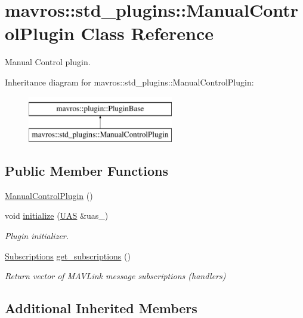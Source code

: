 \hypertarget{classmavros_1_1std__plugins_1_1ManualControlPlugin}{}\section{mavros\+::std\+\_\+plugins\+::Manual\+Control\+Plugin Class Reference}
\label{classmavros_1_1std__plugins_1_1ManualControlPlugin}


Manual Control plugin.  


Inheritance diagram for mavros\+::std\+\_\+plugins\+::Manual\+Control\+Plugin\+:\begin{figure}[H]
\begin{center}
\leavevmode
\includegraphics[height=2.000000cm]{classmavros_1_1std__plugins_1_1ManualControlPlugin}
\end{center}
\end{figure}
\subsection*{Public Member Functions}
\begin{DoxyCompactItemize}
\item 
\mbox{\hyperlink{group__plugin_ga8e2654a3b76c1f377d99fd21817d8e3c}{Manual\+Control\+Plugin}} ()
\item 
void \mbox{\hyperlink{group__plugin_ga20c1a742c3270e32e681f08f79199451}{initialize}} (\mbox{\hyperlink{classmavros_1_1UAS}{U\+AS}} \&uas\+\_\+)
\begin{DoxyCompactList}\small\item\em Plugin initializer. \end{DoxyCompactList}\item 
\mbox{\hyperlink{group__plugin_ga8967d61fc77040e0c3ea5a4585d62a09}{Subscriptions}} \mbox{\hyperlink{group__plugin_ga2cd6218d2064c57672b01df2900c3de2}{get\+\_\+subscriptions}} ()
\begin{DoxyCompactList}\small\item\em Return vector of M\+A\+V\+Link message subscriptions (handlers) \end{DoxyCompactList}\end{DoxyCompactItemize}
\subsection*{Additional Inherited Members}


